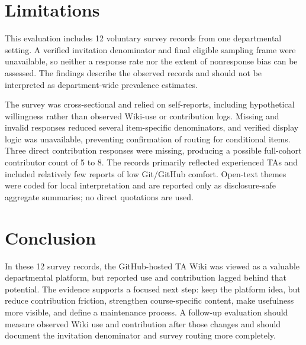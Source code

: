 \documentclass[11pt]{article}
\begin{document}
\section{Limitations}
This evaluation includes 12 voluntary survey records from one departmental setting. A verified invitation denominator and final eligible sampling frame were unavailable, so neither a response rate nor the extent of nonresponse bias can be assessed. The findings describe the observed records and should not be interpreted as department-wide prevalence estimates.

The survey was cross-sectional and relied on self-reports, including hypothetical willingness rather than observed Wiki-use or contribution logs. Missing and invalid responses reduced several item-specific denominators, and verified display logic was unavailable, preventing confirmation of routing for conditional items. Three direct contribution responses were missing, producing a possible full-cohort contributor count of 5 to 8. The records primarily reflected experienced TAs and included relatively few reports of low Git/GitHub comfort. Open-text themes were coded for local interpretation and are reported only as disclosure-safe aggregate summaries; no direct quotations are used.

\section{Conclusion}
In these 12 survey records, the GitHub-hosted TA Wiki was viewed as a valuable departmental platform, but reported use and contribution lagged behind that potential. The evidence supports a focused next step: keep the platform idea, but reduce contribution friction, strengthen course-specific content, make usefulness more visible, and define a maintenance process. A follow-up evaluation should measure observed Wiki use and contribution after those changes and should document the invitation denominator and survey routing more completely.
\end{document}
